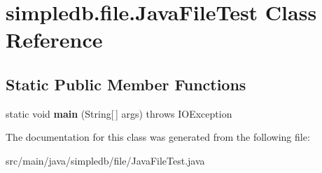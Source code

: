 \hypertarget{classsimpledb_1_1file_1_1JavaFileTest}{}\section{simpledb.\+file.\+Java\+File\+Test Class Reference}
\label{classsimpledb_1_1file_1_1JavaFileTest}
\subsection*{Static Public Member Functions}
\begin{DoxyCompactItemize}
\item 
\mbox{\label{classsimpledb_1_1file_1_1JavaFileTest_ac1ab5cd5e6ac8d9160c88903f1dd6a2d}} 
static void {\bfseries main} (String\mbox{[}$\,$\mbox{]} args)  throws I\+O\+Exception 
\end{DoxyCompactItemize}


The documentation for this class was generated from the following file\+:\begin{DoxyCompactItemize}
\item 
src/main/java/simpledb/file/Java\+File\+Test.\+java\end{DoxyCompactItemize}
